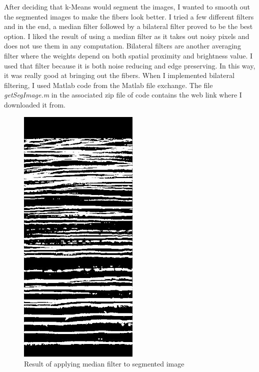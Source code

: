 \documentclass[11pt,psfig]{article}
\begin{document}
After deciding that k-Means would segment the images, I wanted to smooth out the segmented images to make the fibers look better. I tried a few different filters and in the end, a median filter followed by a bilateral filter proved to be the best option. I liked the result of using a median filter as it takes out noisy pixels and does not use them in any computation. Bilateral filters are another averaging filter where the weights depend on both spatial proximity and brightness value. I used that filter because it is both noise reducing and edge preserving. In this way, it was really good at bringing out the fibers. When I implemented bilateral filtering, I used Matlab code from the Matlab file exchange. The file \textit{getSegImage.m} in the associated zip file of code contains the web link where I downloaded it from. 
\begin{figure}[H]
\centering
\includegraphics[height=5in]{image1_medianFilterResult.jpg}
\caption{Result of applying median filter to segmented image}
\end{figure}
\end{document}
